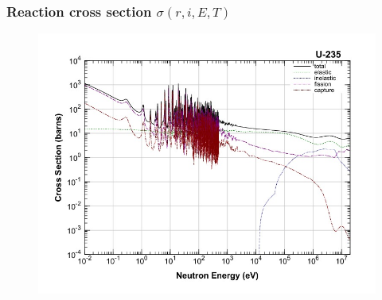 \begin{frame}
  \frametitle{Reaction cross section $\sigma(r,i,E,T)$}
               \begin{figure}[t]
                \vspace*{-0.1in}
                \includegraphics[height=0.70\textwidth]{./images/u235_f1.jpg}
               \end{figure}            
\end{frame}

